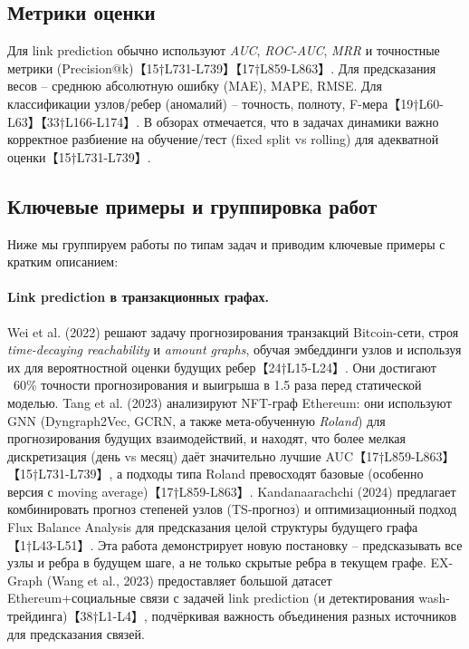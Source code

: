 \subsection{Метрики оценки}
Для link prediction обычно используют \emph{AUC}, \emph{ROC-AUC}, \emph{MRR} и точностные метрики (Precision@k)【15†L731-L739】【17†L859-L863】. Для предсказания весов – среднюю абсолютную ошибку (MAE), MAPE, RMSE. Для классификации узлов/ребер (аномалий) – точность, полноту, F-мера【19†L60-L63】【33†L166-L174】. В обзорах отмечается, что в задачах динамики важно корректное разбиение на обучение/тест (fixed split vs rolling) для адекватной оценки【15†L731-L739】. 

\subsection{Ключевые примеры и группировка работ}
Ниже мы группируем работы по типам задач и приводим ключевые примеры с кратким описанием:

\paragraph{Link prediction в транзакционных графах.}  Wei et al. (2022) решают задачу прогнозирования транзакций Bitcoin-сети, строя \emph{time-decaying reachability} и \emph{amount graphs}, обучая эмбеддинги узлов и используя их для вероятностной оценки будущих ребер【24†L15-L24】. Они достигают ~60\% точности прогнозирования и выигрыша в 1.5 раза перед статической моделью. Tang et al. (2023) анализируют NFT-граф Ethereum: они используют GNN (Dyngraph2Vec, GCRN, а также мета-обученную \emph{Roland}) для прогнозирования будущих взаимодействий, и находят, что более мелкая дискретизация (день vs месяц) даёт значительно лучшие AUC【17†L859-L863】【15†L731-L739】, а подходы типа Roland превосходят базовые (особенно версия с moving average)【17†L859-L863】. Kandanaarachchi (2024) предлагает комбинировать прогноз степеней узлов (TS-прогноз) и оптимизационный подход Flux Balance Analysis для предсказания целой структуры будущего графа【1†L43-L51】. Эта работа демонстрирует новую постановку – предсказывать все узлы и ребра в будущем шаге, а не только скрытые ребра в текущем графе. EX-Graph (Wang et al., 2023) предоставляет большой датасет Ethereum+социальные связи с задачей link prediction (и детектирования wash-трейдинга)【38†L1-L4】, подчёркивая важность объединения разных источников для предсказания связей. 

